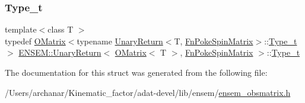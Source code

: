 \subsubsection{\texorpdfstring{Type\_t}{Type\_t}\hspace{0.1cm}{\footnotesize\ttfamily [3/3]}}
{\footnotesize\ttfamily template$<$class T $>$ \\
typedef \mbox{\hyperlink{classENSEM_1_1OMatrix}{O\+Matrix}}$<$typename \mbox{\hyperlink{structENSEM_1_1UnaryReturn}{Unary\+Return}}$<$T, \mbox{\hyperlink{structENSEM_1_1FnPokeSpinMatrix}{Fn\+Poke\+Spin\+Matrix}}$>$\+::\mbox{\hyperlink{structENSEM_1_1UnaryReturn_3_01OMatrix_3_01T_01_4_00_01FnPokeSpinMatrix_01_4_a2018c95323ea7832f6e1e071be4629b8}{Type\+\_\+t}}$>$ \mbox{\hyperlink{structENSEM_1_1UnaryReturn}{E\+N\+S\+E\+M\+::\+Unary\+Return}}$<$ \mbox{\hyperlink{classENSEM_1_1OMatrix}{O\+Matrix}}$<$ T $>$, \mbox{\hyperlink{structENSEM_1_1FnPokeSpinMatrix}{Fn\+Poke\+Spin\+Matrix}} $>$\+::\mbox{\hyperlink{structENSEM_1_1UnaryReturn_3_01OMatrix_3_01T_01_4_00_01FnPokeSpinMatrix_01_4_a2018c95323ea7832f6e1e071be4629b8}{Type\+\_\+t}}}



The documentation for this struct was generated from the following file\+:\begin{DoxyCompactItemize}
\item 
/\+Users/archanar/\+Kinematic\+\_\+factor/adat-\/devel/lib/ensem/\mbox{\hyperlink{adat-devel_2lib_2ensem_2ensem__obsmatrix_8h}{ensem\+\_\+obsmatrix.\+h}}\end{DoxyCompactItemize}
